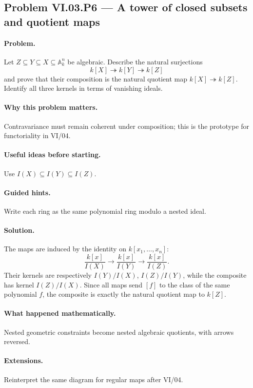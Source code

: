 \subsection*{Problem VI.03.P6 --- A tower of closed subsets and quotient maps}
\label{prob:vi03-p6}
\paragraph{Problem.}
Let \(Z\subseteq Y\subseteq X\subseteq\mathbb A_k^n\) be algebraic.  Describe the natural
surjections
\[
k[X]\twoheadrightarrow k[Y]\twoheadrightarrow k[Z]
\]
and prove that their composition is the natural quotient map \(k[X]\twoheadrightarrow k[Z]\).
Identify all three kernels in terms of vanishing ideals.
\ifdefined\FullProblemDossiers
\paragraph{Why this problem matters.} Contravariance must remain coherent under composition; this is the prototype for functoriality in VI/04.
\paragraph{Useful ideas before starting.} Use \(I(X)\subseteq I(Y)\subseteq I(Z)\).
\paragraph{Guided hints.} Write each ring as the same polynomial ring modulo a nested ideal.
\paragraph{Solution.}
The maps are induced by the identity on \(k[x_1,\dots,x_n]\):
\[
\frac{k[x]}{I(X)}\to\frac{k[x]}{I(Y)}\to\frac{k[x]}{I(Z)}.
\]
Their kernels are respectively \(I(Y)/I(X)\), \(I(Z)/I(Y)\), while the composite has
kernel \(I(Z)/I(X)\).  Since all maps send \([f]\) to the class of the same polynomial
\(f\), the composite is exactly the natural quotient map to \(k[Z]\).
\paragraph{What happened mathematically.} Nested geometric constraints become nested algebraic quotients, with arrows reversed.
\paragraph{Extensions.} Reinterpret the same diagram for regular maps after VI/04.
\fi
